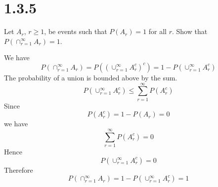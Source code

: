 \section*{1.3.5}
Let $A_r$, $r\ge1$, be events such that $P(A_r)=1$ for all $r$.
Show that $P(\cap_{r=1}^\infty A_r)=1$.

\bigskip
\noindent
We have
$$P(\cap_{r=1}^\infty A_r)=P((\cup_{r=1}^\infty A_r^c)^c)
=1-P(\cup_{r=1}^\infty A_r^c)$$
The probability of a union is bounded above by the sum.
$$P(\cup_{r=1}^\infty A_r^c)\le\sum_{r=1}^\infty P(A_r^c)$$
Since
$$P(A_r^c)=1-P(A_r)=0$$
we have
$$\sum_{r=1}^\infty P(A_r^c)=0$$
Hence
$$P(\cup_{r=1}^\infty A_r^c)=0$$
Therefore
$$P(\cap_{r=1}^\infty A_r)=1-P(\cup_{r=1}^\infty A_r^c)=1$$

